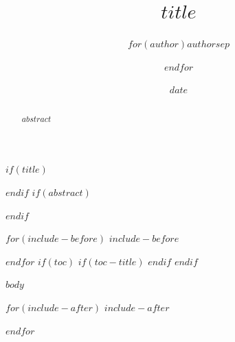 \documentclass[11pt,a4paper$for(classoption)$,$classoption$$endfor$]{article}
\title{$title$}
\author{$for(author)$$author$$sep$ \and $endfor$}
\author{}
\date{$date$}
\date{}
\begin{document}
$if(title)$
\maketitle
$endif$
$if(abstract)$
\begin{abstract}
$abstract$
\end{abstract}
$endif$

$for(include-before)$
$include-before$

$endfor$
$if(toc)$
$if(toc-title)$
\renewcommand*\contentsname{$toc-title$}
$endif$
{
\setcounter{tocdepth}{$toc-depth$}
\tableofcontents
}
$endif$

$body$

$for(include-after)$
$include-after$

$endfor$
\end{document}

